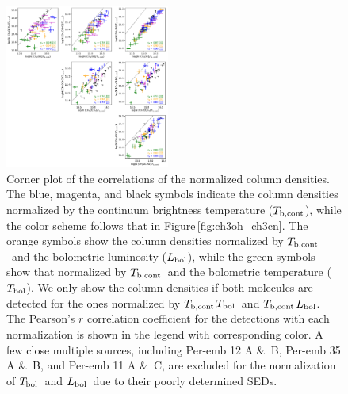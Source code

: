 \documentclass[twocolumn]{aastex62}
\newcommand{\lbol}{\mbox{$L_{\rm bol}$}}
\newcommand{\tbol}{\mbox{$T_{\rm bol}$}}
\newcommand{\tbc}{\mbox{$T_{\rm b, cont}$}}
\begin{document}
\begin{figure}[htbp!]
  \centering
  \includegraphics[width=0.48\textwidth]{corner_Ncol_correlations_combined_norm.pdf}
  \caption{Corner plot of the correlations of the normalized column densities.  The blue, magenta, and black symbols indicate the column densities normalized by the continuum brightness temperature (\tbc), while the color scheme follows that in Figure\,\ref{fig:ch3oh_ch3cn}.  The orange symbols show the column densities normalized by \tbc\ and the bolometric luminosity (\lbol), while the green symbols show that normalized by \tbc\ and the bolometric temperature (\tbol).  We only show the column densities if both molecules are detected for the ones normalized by \tbc\tbol\ and \tbc\lbol.  The Pearson's $r$ correlation coefficient for the detections with each normalization is shown in the legend with corresponding color.  A few close multiple sources, including Per-emb 12 A \&\ B, Per-emb 35 A \&\ B, and Per-emb 11 A \&\ C, are excluded for the normalization of \tbol\ and \lbol\ due to their poorly determined SEDs.}
  \label{fig:corner_combined}
\end{figure}
\end{document}
